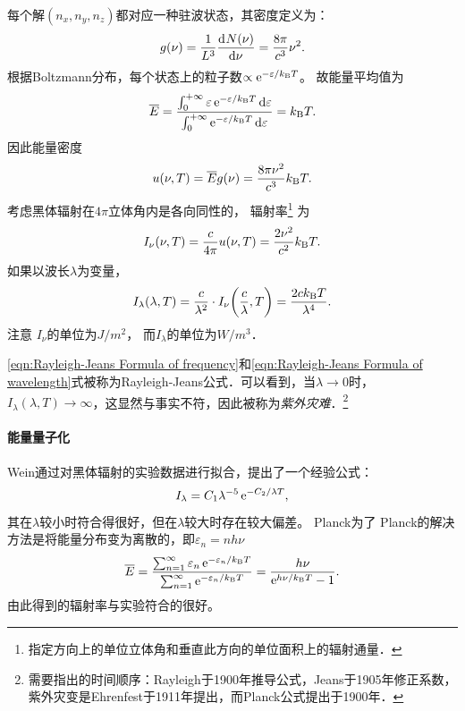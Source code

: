 每个解$(n_x,n_y,n_z)$都对应一种驻波状态，其密度定义为：
\[
	g(\nu)=\frac1{L^3}\frac{\mathrm{d}^{{}}N(\nu)}{\mathrm{d}{\nu}^{{}}}=\frac{8\pi}{c^3}\nu^2.
\]
根据Boltzmann分布，每个状态上的粒子数$\propto\mathop{}\!\mathrm{e}^{-\varepsilon/k_{\mathrm B} T}$。
故能量平均值为
\begin{align}
	\overline{E}=\frac{\textstyle\int_0^{+\infty}\varepsilon\mathop{}\!\mathrm{e}^{-\varepsilon/k_{\mathrm B} T}\mathop{}\!\mathrm{d}\varepsilon}{\textstyle\int_0^{+\infty}\mathop{}\!\mathrm{e}^{-\varepsilon/k_{\mathrm B} T}\mathop{}\!\mathrm{d}\varepsilon}=k_{\mathrm B} T.
\end{align}
因此能量密度
\[
u(\nu,T)=\overline{E}g(\nu)=\frac{8\pi\nu^2}{c^3}k_{\mathrm B} T.
\]
考虑黑体辐射在$4\pi$立体角内是各向同性的，
辐射率\footnote{指定方向上的单位立体角和垂直此方向的单位面积上的辐射通量．}
为
\begin{align}
	\label{eqn:Rayleigh-Jeans Formula of frequency}
	I_\nu(\nu,T)=\frac c{4\pi}u(\nu,T)=\frac{2\nu^2}{c^2}k_{\mathrm B} T.
\end{align}
如果以波长$\lambda$为变量，%
\begin{align}
	\label{eqn:Rayleigh-Jeans Formula of wavelength}
	I_\lambda(\lambda,T)=\frac{c}{\lambda^2}\cdot I_\nu\biggl(\frac c\lambda,T\biggr)=\frac{2ck_{\mathrm B} T}{\lambda^4}.
\end{align}
注意
$I_\nu$的单位为$\si{J/m^2}$，
而$I_\lambda$的单位为$\si{W/m^3}$．

\eqref{eqn:Rayleigh-Jeans Formula of frequency}和\eqref{eqn:Rayleigh-Jeans Formula of wavelength}式被称为Rayleigh-Jeans公式．可以看到，当$\lambda\to0$时，$I_\lambda(\lambda,T)\to\infty$，这显然与事实不符，因此被称为\textit{紫外灾难}．\footnote{需要指出的时间顺序：Rayleigh于1900年推导公式，Jeans于1905年修正系数，紫外灾变是Ehrenfest于1911年提出，而Planck公式提出于1900年．}

\paragraph{能量量子化}

Wein通过对黑体辐射的实验数据进行拟合，提出了一个经验公式：
\begin{equation}
	I_\lambda=C_1\lambda^{-5}\mathop{}\!\mathrm{e}^{-C_2/\lambda T},
\end{equation}
其在$\lambda$较小时符合得很好，但在$\lambda$较大时存在较大偏差。
Planck为了
Planck的解决方法是将能量分布变为离散的，即$\varepsilon_n=nh\nu$
\begin{align}
	\overline{E}=\frac{\textstyle\sum_{n=1}^\infty \varepsilon_n\mathop{}\!\mathrm{e}^{-\varepsilon_n/k_{\mathrm B} T}}{\textstyle\sum_{n=1}^\infty\mathop{}\!\mathrm{e}^{-\varepsilon_n/k_{\mathrm B} T}}=\frac{h\nu}{\mathop{}\!\mathrm{e}^{h\nu/k_{\mathrm B} T}-1}.
\end{align}
由此得到的辐射率与实验符合的很好。

